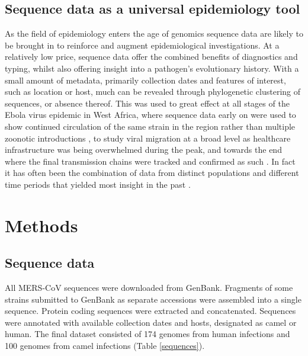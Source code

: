 \documentclass[11pt,oneside,letterpaper]{article}
\def\gdc#1{\textcolor{blue}{[#1]}}
\def\lmc#1{\textcolor{green}{[#1]}}
\begin{document}
\subsection*{Sequence data as a universal epidemiology tool} %
As the field of epidemiology enters the age of genomics sequence data are likely to be brought in to reinforce and augment epidemiological investigations.
At a relatively low price, sequence data offer the combined benefits of diagnostics and typing, whilst also offering insight into a pathogen's evolutionary history.
With a small amount of metadata, primarily collection dates and features of interest, such as location or host, much can be revealed through phylogenetic clustering of sequences, or absence thereof.
This was used to great effect at all stages of the Ebola virus epidemic in West Africa, where sequence data early on were used to show continued circulation of the same strain in the region rather than multiple zoonotic introductions \citep{gire_genomic_2014}, to study viral migration at a broad level \citep{park_ebola_2015,ladner_evolution_2015} as healthcare infrastructure was being overwhelmed during the peak, and towards the end where the final transmission chains were tracked and confirmed as such \citep{arias_rapid_2016}.
In fact it has often been the combination of data from distinct populations and different time periods that yielded most insight in the past \citep{dudas_virus_2017}.


\newpage

\section*{Methods}
\subsection*{Sequence data}
All MERS-CoV sequences were downloaded from GenBank.%
Fragments of some strains submitted to GenBank as separate accessions were assembled into a single sequence.
Protein coding sequences were extracted and concatenated.
Sequences were annotated with available collection dates and hosts, designated as camel or human.
The final dataset consisted of 174 genomes from human infections and 100 genomes from camel infections (Table \ref{sequences}).
\end{document}
